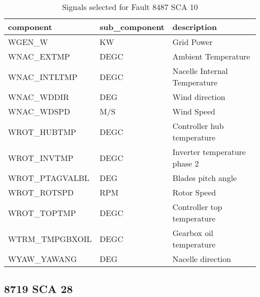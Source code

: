 \begin{table}[!ht]
    \centering
    \begin{tabular}{|l|l|l|}
    \hline
        component & sub\_component & description \\ \hline
        WGEN\_W & KW & Grid Power \\ \hline
        WNAC\_EXTMP & DEGC & Ambient Temperature \\ \hline
        WNAC\_INTLTMP & DEGC & Nacelle Internal Temperature \\ \hline
        WNAC\_WDDIR & DEG & Wind direction \\ \hline
        WNAC\_WDSPD & M/S & Wind Speed \\ \hline
        WROT\_HUBTMP & DEGC & Controller hub temperature \\ \hline
        WROT\_INVTMP & DEGC & Inverter temperature phase 2 \\ \hline
        WROT\_PTAGVALBL & DEG & Blades pitch angle \\ \hline
        WROT\_ROTSPD & RPM & Rotor Speed \\ \hline
        WROT\_TOPTMP & DEGC & Controller top temperature \\ \hline
        WTRM\_TMPGBXOIL & DEGC & Gearbox oil temperature \\ \hline
        WYAW\_YAWANG & DEG & Nacelle direction \\ \hline
    \end{tabular}
    \caption{Signals selected for Fault 8487 SCA 10}
\end{table}

\subsection{8719 SCA 28}

